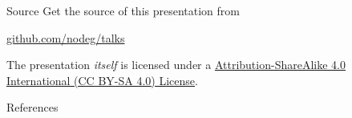 \documentclass[ngerman]{beamer}
\begin{document}
\begin{frame}{Source}
  Get the source of this presentation from
  \begin{center}\url{github.com/nodeg/talks}\end{center}
  The presentation \emph{itself} is licensed under a  \href{https://creativecommons.org/licenses/by-sa/4.0/}{Attribution-ShareAlike 4.0 International (CC BY-SA 4.0) License}.
  \begin{center}\doclicenseImage\end{center}
\end{frame}

\begin{frame}[allowframebreaks]{References}
  
  
\end{frame}
\end{document}

